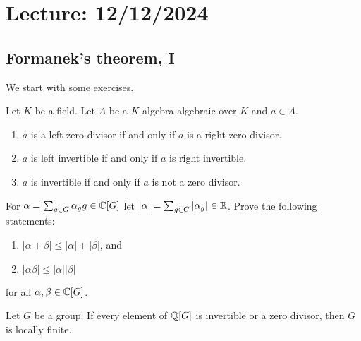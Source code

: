 \section{Lecture: 12/12/2024}
\label{11}

\subsection{Formanek's theorem, I}

We start with some exercises. 

\begin{exercise}
\label{xca:invertible_algebraic}
	Let $K$ be a field. Let $A$ be a $K$-algebra algebraic over $K$ and $a\in A$.
	\begin{enumerate}
		\item $a$ is a left zero divisor if and only if $a$ is a right zero divisor.
		\item $a$ is left invertible if and only if $a$ is right invertible.
		\item $a$ is invertible if and only if $a$ is not a zero divisor.
	\end{enumerate}
\end{exercise}

\begin{exercise}
	\label{exa:norma}
	For $\alpha=\sum_{g\in G}\alpha_gg\in\mathbb{C}[G]$ let $|\alpha|=\sum_{g\in
	G}|\alpha_g|\in\mathbb{R}$. Prove the following statements:
	\begin{enumerate}
		\item $|\alpha+\beta|\leq|\alpha|+|\beta|$, and 
		\item $|\alpha\beta|\leq|\alpha||\beta|$ 
	\end{enumerate}
	for all $\alpha,\beta\in\mathbb{C}[G]$.
\end{exercise}

\begin{theorem}[Formanek]
	\label{thm:FormanekQ}
	Let $G$ be a group. If every element of $\mathbb{Q}[G]$ is invertible or 
	a zero divisor, then $G$ is locally finite. 
\end{theorem}

